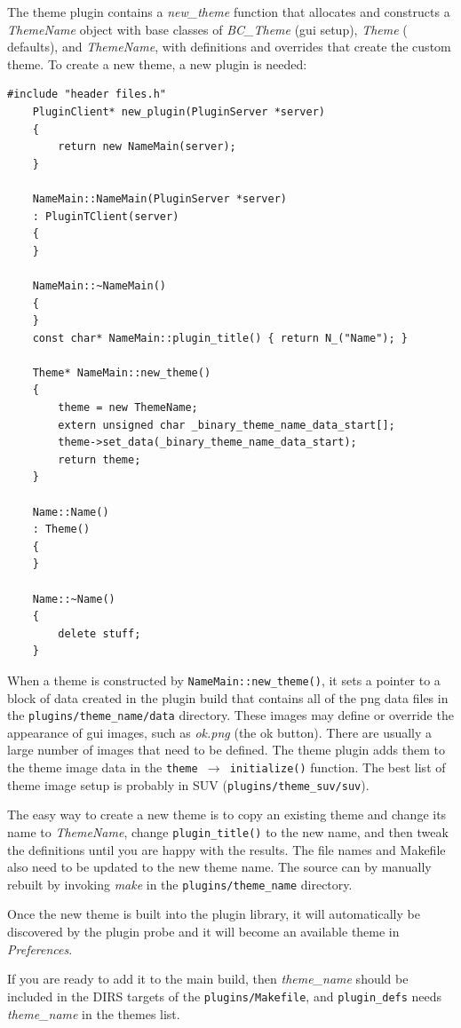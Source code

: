 The theme plugin contains a \textit{new\_theme} function that allocates and constructs a
\textit{ThemeName} object with base classes of \textit{BC\_Theme} (gui setup), \textit{Theme} (\CGG{} defaults), and \textit{ThemeName}, with definitions and overrides that create the custom theme. To create a new theme, a new plugin is needed:

\begin{lstlisting}[numbers=none]
	#include "header files.h"
	PluginClient* new_plugin(PluginServer *server)
	{
		return new NameMain(server);
	}
	
	NameMain::NameMain(PluginServer *server)
	: PluginTClient(server)
	{
	}
	
	NameMain::~NameMain()
	{
	}
	const char* NameMain::plugin_title() { return N_("Name"); }
	
	Theme* NameMain::new_theme()
	{
		theme = new ThemeName;
		extern unsigned char _binary_theme_name_data_start[];
		theme->set_data(_binary_theme_name_data_start);
		return theme;
	}
	
	Name::Name()
	: Theme()
	{
	}
	
	Name::~Name()
	{
		delete stuff;
	}
\end{lstlisting}

When a theme is constructed by \texttt{NameMain::new\_theme()}, it sets a pointer to a
block of data created in the plugin build that contains all of the png data
files in the \texttt{plugins/theme\_name/data} directory.  These images may define or override the appearance of gui images, such as \textit{ok.png} (the ok button).  There are usually a large number of images that need to be defined.  The theme plugin adds them to the theme image data in the \texttt{theme $\rightarrow$ initialize()} function.  The best list of theme image setup is probably in SUV (\texttt{plugins/theme\_suv/suv}).

The easy way to create a new theme is to copy an existing theme and change
its name to \textit{ThemeName}, change \texttt{plugin\_title()} to the new name, and then tweak the definitions until you are happy with the results.   The file
names and Makefile also need to be updated to the new theme name.  The source
can by manually rebuilt by invoking \textit{make} in the \texttt{plugins/theme\_name}
directory.

Once the new theme is built into the plugin library, it will automatically be discovered by the plugin probe
and it will become an available theme in \textit{Preferences}.

If you are ready to add it to the main build, then \textit{theme\_name} should be
included in the DIRS targets of the \texttt{plugins/Makefile}, and \texttt{plugin\_defs} needs \textit{theme\_name} in the themes list.

